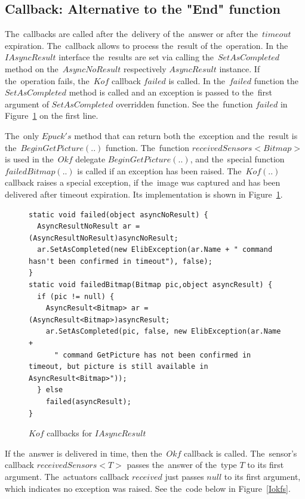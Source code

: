  \subsection{Callback: Alternative to the "End" function} 
  The~callbacks are called after the~delivery of the~answer or after the~$timeout$ expiration.
  The~callback allows to process the~result of the~operation.
  In the~$IAsyncResult$ interface the~results are set via calling the~$SetAsCompleted$ method 
  on the~$AsyncNoResult$ respectively $AsyncResult$ instance.
  If the~operation fails, the~$Kof$ callback $failed$ is called. 
  In the~$failed$ function the~$SetAsCompleted$ method is called 
  and an exception is passed to the~first argument of $SetAsCompleted$ overridden function.
  See the~function $failed$ in Figure~\ref{Ikofs} on the first line.

  The~only $Epuck's$ method that can return both the~exception and the~result is the~$BeginGetPicture(..)$ function.
  The~function $receivedSensors<Bitmap>$ is used in the~$Okf$ delegate $BeginGetPicture(..)$, and 
  the~special function $failedBitmap(..)$ is called if an exception has been raised.
  The~$Kof(..)$ callback raises a special exception, if the~image was captured and has been 
  delivered after timeout expiration.
  Its implementation is shown in Figure~\ref{Ikofs}. 

  
\begin{figure}[!hbp]
\begin{lstlisting}
static void failed(object asyncNoResult) {
  AsyncResultNoResult ar = (AsyncResultNoResult)asyncNoResult;
  ar.SetAsCompleted(new ElibException(ar.Name + " command hasn't been confirmed in timeout"), false); 
}
static void failedBitmap(Bitmap pic,object asyncResult) {
  if (pic != null) {
    AsyncResult<Bitmap> ar = (AsyncResult<Bitmap>)asyncResult;        
    ar.SetAsCompleted(pic, false, new ElibException(ar.Name + 
      " command GetPicture has not been confirmed in timeout, but picture is still available in AsyncResult<Bitmap>"));
  } else
    failed(asyncResult);
}
\end{lstlisting}	
\caption{$Kof$ callbacks for $IAsyncResult$} \label{Ikofs}
\end{figure}


  If the~answer is delivered in time, then the~$Okf$ callback is called.
  The~sensor's callback $receivedSensors<T>$ passes the~answer of the~type $T$ to its first argument.
  The~actuators callback $received$ just passes $null$ to its first argument, which indicates
  no exception was raised.
  See the~code below in Figure~\ref{Iokfs}.


